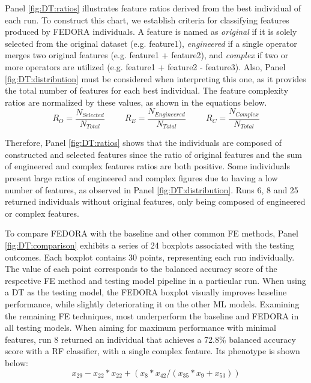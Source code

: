 Panel \ref{fig:DT:ratios} illustrates feature ratios derived from the best individual of each run. To construct this chart, we establish criteria for classifying features produced by FEDORA individuals. A feature is named as \textit{original} if it is solely selected from the original dataset (e.g. feature1), \textit{engineered} if a single operator merges two original features (e.g. feature1 + feature2), and \textit{complex} if two or more operators are utilized (e.g. feature1 + feature2 - feature3). Also, Panel \ref{fig:DT:distribution} must be considered when interpreting this one, as it provides the total number of features for each best individual. The feature complexity ratios are normalized by these values, as shown in the equations below.
\begin{equation*}
R_{O} = \frac{N_{Selected}}{N_{Total}} \hspace{1cm} R_{E} = \frac{N_{Engineered}}{N_{Total}}\hspace{1cm} R_{C} = \frac{N_{Complex}}{N_{Total}}
\end{equation*}

Therefore, Panel \ref{fig:DT:ratios} shows that the individuals are composed of constructed and selected features since the ratio of original features and the sum of engineered and complex features ratios are both positive. Some individuals present large ratios of engineered and complex figures due to having a low number of features, as observed in Panel \ref{fig:DT:distribution}. Runs 6, 8 and 25 returned individuals without original features, only being composed of engineered or complex features. 

To compare FEDORA with the baseline and other common \gls{FE} methods, Panel \ref{fig:DT:comparison} exhibits a series of 24 boxplots associated with the testing outcomes. Each boxplot contains 30 points, representing each run individually. The value of each point corresponds to the balanced accuracy score of the respective \gls{FE} method and testing model pipeline in a particular run. When using a \gls{DT} as the testing model, the FEDORA boxplot visually improves baseline performance, while slightly deteriorating it on the other \gls{ML} models. Examining the remaining \gls{FE} techniques, most underperform the baseline and FEDORA in all testing models. When aiming for maximum performance with minimal features, run 8 returned an individual that achieves a 72.8\% balanced accuracy score with a \gls{RF} classifier, with a single complex feature. Its phenotype is shown below:
$$x_{29}-x_{22}*x_{22}+(x_{8}*x_{42}/(x_{35}*x_{9}+x_{53}))$$

